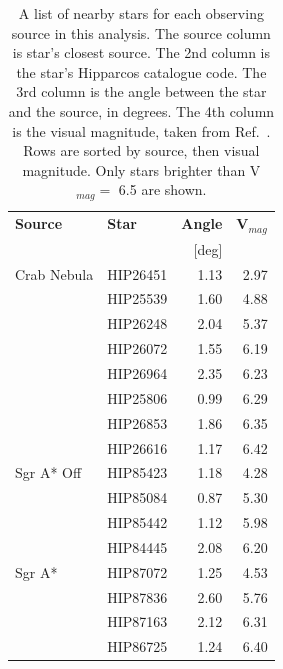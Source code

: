 {    \begin{table}[t]
      \centering
      \begin{tabular}{|l|l|r|r|}
        \hline
        \textbf{Source} & \textbf{Star} & \textbf{Angle} & \textbf{V${}_{mag}$} \\ 
                        &               & [deg]             &                      \\
        \hline
        Crab Nebula & HIP26451 & 1.13 & 2.97 \\
                    & HIP25539 & 1.60 & 4.88 \\
                    & HIP26248 & 2.04 & 5.37 \\
                    & HIP26072 & 1.55 & 6.19 \\
                    & HIP26964 & 2.35 & 6.23 \\
                    & HIP25806 & 0.99 & 6.29 \\
                    & HIP26853 & 1.86 & 6.35 \\
                    & HIP26616 & 1.17 & 6.42 \\
        \hline
        Sgr A* Off  & HIP85423 & 1.18 & 4.28 \\
                    & HIP85084 & 0.87 & 5.30 \\
                    & HIP85442 & 1.12 & 5.98 \\
                    & HIP84445 & 2.08 & 6.20 \\
        \hline
        Sgr A*      & HIP87072 & 1.25 & 4.53 \\
                    & HIP87836 & 2.60 & 5.76 \\
                    & HIP87163 & 2.12 & 6.31 \\
                    & HIP86725 & 1.24 & 6.40 \\
        \hline
      \end{tabular}
      \caption[Bright Stars in the Fields of View]{
        A list of nearby stars for each observing source in this analysis.
        The source column is star's closest source.
        The 2nd column is the star's Hipparcos catalogue code.
        The 3rd column is the angle between the star and the source, in degrees.
        The 4th column is the visual magnitude, taken from Ref.~\cite{hipparcos_catalogue}.
        Rows are sorted by source, then visual magnitude.
        Only stars brighter than V${}_{mag}=$ 6.5 are shown.
      }
      \label{tab:brightstars}
    \end{table}

}
